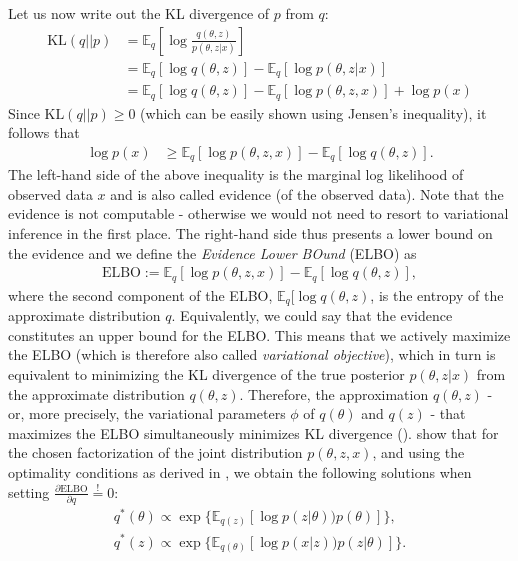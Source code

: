 Let us now write out the KL divergence of $p$ from $q$:
\begin{align*}
\text{KL}(q||p) &= \mathbb{E}_q[\log\frac{q(\theta,z)}{p(\theta,z|x)}] \\
&= \mathbb{E}_q[\log q(\theta,z)] - \mathbb{E}_q[\log p(\theta,z|x)] \\
&=\mathbb{E}_q[\log q(\theta,z)] - \mathbb{E}_q[\log p(\theta,z,x)] + \log p(x) 
\end{align*}
Since $\text{KL}(q||p) \geq 0$ (which can be easily shown using Jensen's inequality), it follows that
\begin{align*}
\log p(x) & \geq \mathbb{E}_q[\log p(\theta,z,x)] - \mathbb{E}_q[\log q(\theta,z)].
\end{align*}
The left-hand side of the above inequality is the marginal log likelihood of observed data $x$ and is also called evidence (of the observed data). Note that the evidence is not computable - otherwise we would not need to resort to variational inference in the first place. The right-hand side thus presents a lower bound on the evidence and we define the \textit{Evidence Lower BOund} (ELBO) as
\begin{align*}
\text{ELBO} := \mathbb{E}_q[\log p(\theta,z,x)] - \mathbb{E}_q[\log q(\theta,z)],
\end{align*}
where the second component of the ELBO, $\mathbb{E}_q[\log q(\theta,z)$, is the entropy of the approximate distribution $q$. Equivalently, we could say that the evidence constitutes an upper bound for the ELBO. This means that we actively maximize the ELBO (which is therefore also called \textit{variational objective}), which in turn is equivalent to minimizing the KL divergence of the true posterior $p(\theta,z|x)$ from the approximate distribution $q(\theta,z)$. Therefore, the approximation $q(\theta,z)$ - or, more precisely, the variational parameters $\phi$ of $q(\theta)$ and $q(z)$ - that maximizes the ELBO simultaneously minimizes KL divergence (\citealp{blei2003latent, wang2013variational}). \cite{wang2013variational} show that for the chosen factorization of the joint distribution $p(\theta,z,x)$, and using the optimality conditions as derived in \cite{bishop2006pattern}, we obtain the following solutions when setting $\frac{\partial \text{ELBO}}{\partial q}\overset{!}{=}0$:
\begin{align*}
q^{*}(\theta) \propto \exp\{\mathbb{E}_{q(z)}[\log p(z|\theta))p(\theta)]\}, \\
q^{*}(z) \propto \exp\{\mathbb{E}_{q(\theta)}[\log p(x|z))p(z|\theta)]\}.
\end{align*}

